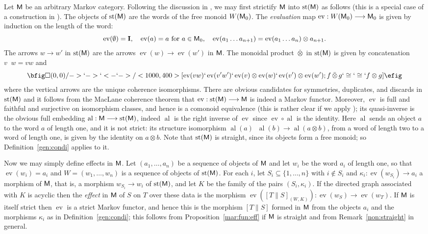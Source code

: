\documentclass[12pt]{amsart}
\theoremstyle{plain}
\theoremstyle{definition}
\theoremstyle{remark}
\numberwithin{equation}{section}
\theoremstyle{plain}
\newcommand{\0}{\emptyset}
\newcommand{\fun}{\longrightarrow}
\newcommand{\sub}{\subseteq}
\newcommand{\cat}[1]{\textup{\textsf{#1}}}
\newcommand{\memph}[1]{{\color{magenta}\emph{#1}}}
\newcommand{\moi}{\mathbf{I}}
\DeclareMathOperator{\str}{st}
\DeclareMathOperator{\eval}{ev}
\DeclareMathOperator{\alp}{al}
\DeclareMathOperator{\botimes}{\bar \otimes}
\begin{document}
Let $\cat M$ be an arbitrary Markov category. Following the discussion in \cite[\S~1.1]{joyal1991geometry}, we may first strictify  $\cat M$ into $\str(\cat M)$ as follows (this is a special case of a construction in \cite[\S~2]{maclane1985coherence}).  The objects of $\str(\cat M)$ are the words of the free monoid $W(\cat M_0)$. The \memph{evaluation} map $\eval : W(\cat M_0) \fun \cat M_0$ is given by induction on the length of the word:
\[
\eval(\0) = \moi, \quad \eval(a) = a \text{ for } a \in \cat M_0, \quad \eval(a_1 \ldots a_{n+1}) = \eval(a_1 \ldots a_{n}) \otimes a_{n+1}.
\]
The arrows $w \fun w'$ in $\str(\cat M)$ are the arrows $\eval(w) \fun \eval(w')$ in $\cat M$. The monoidal product $\bar \otimes$ in $\str(\cat M)$ is given by concatenation ${v}  \botimes {w} = vw$ and
\begin{equation*}
  \bfig
      \square(0,0)/->`->`<-`->/<1000, 400>[\eval(vw)`\eval(v'w')`\eval(v) \otimes \eval(w)`\eval(v') \otimes \eval(w'); f \botimes g`\cong`\cong`f \otimes g]
  \efig
\end{equation*}
where the vertical arrows are the unique coherence isomorphisms. There are obvious candidates for symmetries,  duplicates, and discards in $\str(\cat M)$ and  it follows from the MacLane coherence theorem that $\eval : \str(\cat M) \fun \cat M$ is indeed a Markov functor. Moreover,  $\eval$ is full and faithful and surjective on isomorphism classes, and hence is a comonoid equivalence (this is rather clear if we apply \cite[Proposition~10.16]{fritz2020synthetic}); its quasi-inverse is the obvious full embedding $\alp : \cat M \fun \str(\cat M)$, indeed $\alp$  is the right inverse of $\eval$ since $\eval \circ \alp$ is the identity. Here $\alp$ sends an object $a$ to the word $a$ of length one, and it is not strict: its structure isomorphism $\alp(a) \botimes \alp(b) \fun \alp(a \otimes b)$, from a word of length two to a word of length one, is given by the identity on $a \otimes b$. Note that $\str(\cat M)$ is straight, since its objects form a free monoid; so Definition~\ref{gen:condi} applies to it.

Now we may simply define effects in $\cat M$. Let $(a_1, \ldots, a_n)$ be a sequence of objects of $\cat M$ and let $w_i$ be the word $a_i$ of length one, so that $\eval(w_i) = a_i$ and $W = (w_1, \ldots, w_n)$ is a sequence of objects of $\str(\cat M)$. For each $i$, let $S_i \sub \{1, \ldots, n\}$ with $i \notin S_i$ and $\kappa_i : \eval(w_{S_i}) \fun a_i$ a morphism of $\cat M$, that is, a morphism $w_{S_i} \fun w_i$ of $\str(\cat M)$, and let $K$ be the family of the pairs $(S_i, \kappa_i)$. If the directed graph associated with $K$ is acyclic then the \memph{effect} in $\cat M$ of $S$ on $T$ over these data is the morphism $\eval([T \| S]_{(W, K)}) : \eval(w_S) \fun \eval(w_T)$. If $\cat M$ is itself strict then $\eval$ is a strict Markov functor, and hence this is the morphism $[T \| S]$ formed in $\cat M$ from the objects $a_i$ and the morphisms $\kappa_i$ as in Definition~\ref{gen:condi}; this follows from Proposition~\ref{mar:fun:eff} if $\cat M$ is straight and from Remark~\ref{non:straight} in general.
\end{document}
